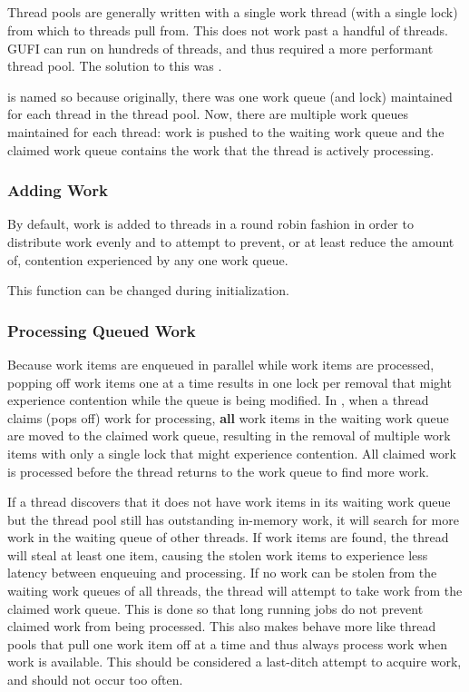 \subsection{\qptp}
Thread pools are generally written with a single work thread (with a
single lock) from which to threads pull from. This does not work past
a handful of threads. GUFI can run on hundreds of threads, and thus
required a more performant thread pool. The solution to this was
\qptp.

\qptp is named so because originally, there was one work queue (and
lock) maintained for each thread in the thread pool. Now, there are
multiple work queues maintained for each thread: work is pushed to the
waiting work queue and the claimed work queue contains the work that
the thread is actively processing.

\subsubsection{Adding Work}
By default, work is added to threads in a round robin fashion in order
to distribute work evenly and to attempt to prevent, or at least
reduce the amount of, contention experienced by any one work queue.

This function can be changed during initialization.

\subsubsection{Processing Queued Work}
Because work items are enqueued in parallel while work items are
processed, popping off work items one at a time results in one lock
per removal that might experience contention while the queue is being
modified. In \qptp, when a thread claims (pops off) work for
processing, {\bf all} work items in the waiting work queue are moved
to the claimed work queue, resulting in the removal of multiple work
items with only a single lock that might experience contention. All
claimed work is processed before the thread returns to the work queue
to find more work.

If a thread discovers that it does not have work items in its waiting
work queue but the thread pool still has outstanding in-memory work,
it will search for more work in the waiting queue of other threads. If
work items are found, the thread will steal at least one item, causing
the stolen work items to experience less latency between enqueuing and
processing. If no work can be stolen from the waiting work queues of
all threads, the thread will attempt to take work from the claimed
work queue. This is done so that long running jobs do not prevent
claimed work from being processed. This also makes \qptp behave more
like thread pools that pull one work item off at a time and thus
always process work when work is available. This should be considered
a last-ditch attempt to acquire work, and should not occur too often.

